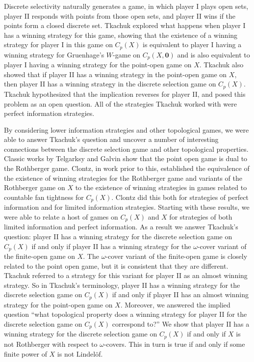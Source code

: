 \documentclass{amsart}
\theoremstyle{plain}
\theoremstyle{definition}
\theoremstyle{remark}
\theoremstyle{plain}
\theoremstyle{definition}
\theoremstyle{remark}
\begin{document}
Discrete selectivity naturally generates a game, in which player I plays open sets, player II responds with points from those open sets, and player II wins if the points form a closed discrete set.
Tkachuk explored what happens when player I has a winning strategy for this game, showing that the existence of a winning strategy for player I in this game on \(C_p(X)\) is equivalent to player I having a winning strategy for Gruenhage's \(W\)-game on \(C_p(X,\mathbf 0)\) and is also equivalent to player I having a winning strategy for the point-open game on \(X\)\cite{Tkachuk3}.
Tkachuk also showed that if player II has a winning strategy in the point-open game on \(X\), then player II has a winning strategy in the discrete selection game on \(C_p(X)\).
Tkachuk hypothesized that the implication reverses for player II, and posed this problem as an open question.
All of the strategies Tkachuk worked with were perfect information strategies.

By considering lower information strategies and other topological games, we were able to answer Tkachuk's question and uncover a number of interesting connections between the discrete selection game and other topological properties.
Classic works by Telgarksy and Galvin show that the point open game is dual to the Rothberger game\cite{Galvin}.
Clontz, in work prior to this, established the equivalence of the existence of winning strategies for the Rothberger game and variants of the Rothberger game on \(X\) to the existence of winning strategies in games related to countable fan tightness for \(C_p(X)\)\cite{Clontz1}.
Clontz did this both for strategies of perfect information and for limited information strategies.
Starting with these results, we were able to relate a host of games on \(C_p(X)\) and \(X\) for strategies of both limited information and perfect information.
As a result we answer Tkachuk's question: player II has a winning strategy for the discrete selection game on \(C_p(X)\) if and only if player II has a winning strategy for the \(\omega\)-cover variant of the finite-open game on \(X\).
The \(\omega\)-cover variant of the finite-open game is closely related to the point open game, but it is consistent that they are different.
Tkachuk referred to a strategy for this variant for player II as an almost winning strategy.
So in Tkachuk's terminology, player II has a winning strategy for the discrete selection game on \(C_p(X)\) if and only if player II has an almost winning strategy for the point-open game on \(X\).
Moreover, we answered the implied question ``what topological property does a winning strategy for player II for the discrete selection game on \(C_p(X)\) correspond to?''
We show that player II has a winning strategy for the discrete selection game on \(C_p(X)\) if and only if \(X\) is not Rothberger with respect to \(\omega\)-covers.
This in turn is true if and only if some finite power of \(X\) is not Lindel\"{o}f.
\end{document}
